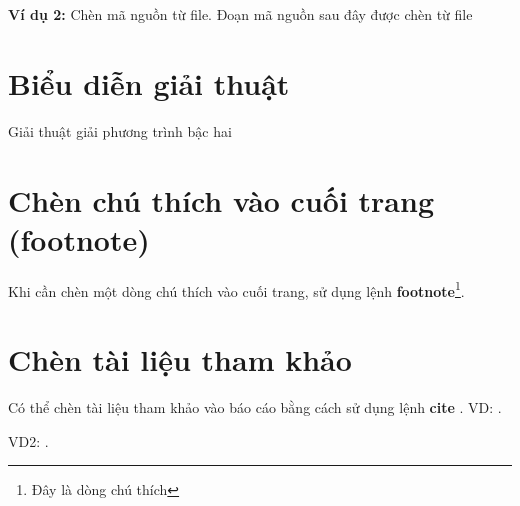 \noindent\textbf{Ví dụ 2:} Chèn mã nguồn từ file. Đoạn mã nguồn sau đây được chèn từ file 



\section{Biểu diễn giải thuật}
\begin{algorithm}[H]
    \SetAlgoLined
    \caption{Giải thuật giải phương trình bậc hai}
\end{algorithm}



\section{Chèn chú thích vào cuối trang (footnote)}
Khi cần chèn một dòng chú thích vào cuối trang, sử dụng lệnh \textbf{footnote}\footnote{Đây là dòng chú thích}.




\section{Chèn tài liệu tham khảo}

Có thể chèn tài liệu tham khảo vào báo cáo bằng cách sử dụng lệnh \textbf{cite} \cite{DBLP:journals/corr/abs-1908-10084}.
VD: \cite{DBLP:journals/corr/abs-1908-10084}.

VD2: \cite{van2010documentation, Gu_recognitionusing}.
